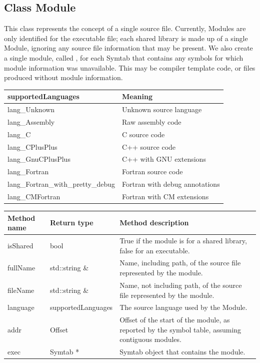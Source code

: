 \subsection{Class Module}
\label{Module}


This class represents the concept of a single source file. Currently, Modules are only identified for the executable file; each shared library is made up of a single Module, ignoring any source file information that may be present. We also create a single module, called , for each Symtab that contains any symbols for which module information was unavailable. This may be compiler template code, or files produced without module information.

\begin{center}
\begin{tabular}{ll}
\toprule
supportedLanguages & Meaning \\
\midrule
lang\_Unknown & Unknown source language \\
lang\_Assembly & Raw assembly code \\
lang\_C & C source code \\
lang\_CPlusPlus & C++ source code \\
lang\_GnuCPlusPlus & C++ with GNU extensions \\
lang\_Fortran & Fortran source code \\
lang\_Fortran\_with\_pretty\_debug & Fortran with debug annotations \\
lang\_CMFortran & Fortran with CM extensions \\
\bottomrule
\end{tabular}
\end{center}

\begin{tabularx}{\textwidth}{llX}
\toprule
Method name & Return type & Method description \\
\midrule
isShared & bool & True if the module is for a shared library, false for an executable. \\
fullName & std::string \& & Name, including path, of the source file represented by the module. \\
fileName & std::string \& & Name, not including path, of the source file represented by the module. \\
language & supportedLanguages & The source language used by the Module. \\
addr & Offset & Offset of the start of the module, as reported by the symbol table, assuming contiguous modules. \\
exec & Symtab * & Symtab object that contains the module. \\
\bottomrule
\end{tabularx}


